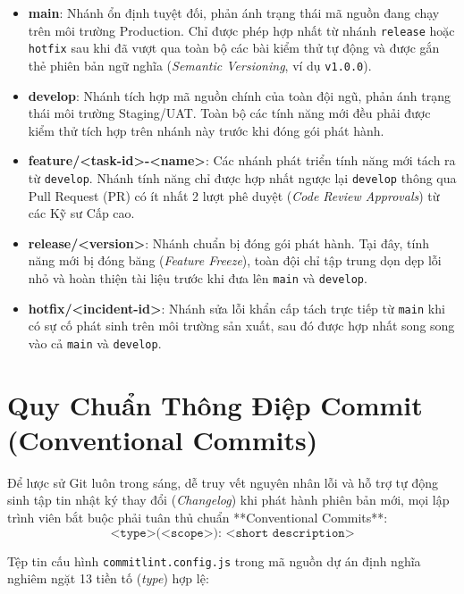 \documentclass[12pt,a4paper,oneside]{book}
\begin{document}
\begin{itemize}
  \item \textbf{main}: Nhánh ổn định tuyệt đối, phản ánh trạng thái mã nguồn đang chạy trên môi trường Production. Chỉ được phép hợp nhất từ nhánh \texttt{release} hoặc \texttt{hotfix} sau khi đã vượt qua toàn bộ các bài kiểm thử tự động và được gắn thẻ phiên bản ngữ nghĩa (\textit{Semantic Versioning}, ví dụ \texttt{v1.0.0}).
  \item \textbf{develop}: Nhánh tích hợp mã nguồn chính của toàn đội ngũ, phản ánh trạng thái môi trường Staging/UAT. Toàn bộ các tính năng mới đều phải được kiểm thử tích hợp trên nhánh này trước khi đóng gói phát hành.
  \item \textbf{feature/<task-id>-<name>}: Các nhánh phát triển tính năng mới tách ra từ \texttt{develop}. Nhánh tính năng chỉ được hợp nhất ngược lại \texttt{develop} thông qua Pull Request (PR) có ít nhất 2 lượt phê duyệt (\textit{Code Review Approvals}) từ các Kỹ sư Cấp cao.
  \item \textbf{release/<version>}: Nhánh chuẩn bị đóng gói phát hành. Tại đây, tính năng mới bị đóng băng (\textit{Feature Freeze}), toàn đội chỉ tập trung dọn dẹp lỗi nhỏ và hoàn thiện tài liệu trước khi đưa lên \texttt{main} và \texttt{develop}.
  \item \textbf{hotfix/<incident-id>}: Nhánh sửa lỗi khẩn cấp tách trực tiếp từ \texttt{main} khi có sự cố phát sinh trên môi trường sản xuất, sau đó được hợp nhất song song vào cả \texttt{main} và \texttt{develop}.
\end{itemize}

\section{Quy Chuẩn Thông Điệp Commit (Conventional Commits)}
Để lược sử Git luôn trong sáng, dễ truy vết nguyên nhân lỗi và hỗ trợ tự động sinh tập tin nhật ký thay đổi (\textit{Changelog}) khi phát hành phiên bản mới, mọi lập trình viên bắt buộc phải tuân thủ chuẩn **Conventional Commits**:
\begin{equation}
  \texttt{<type>(<scope>): <short description>}
\end{equation}

Tệp tin cấu hình \texttt{commitlint.config.js} trong mã nguồn dự án định nghĩa nghiêm ngặt 13 tiền tố (\textit{type}) hợp lệ:
\end{document}
